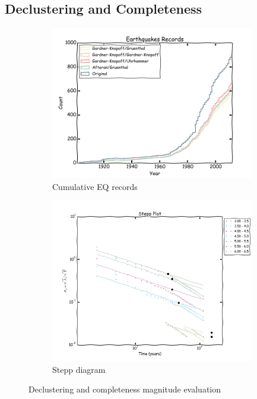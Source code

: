\documentclass[final]{beamer}
\begin{document}
\begin{poster}
\section{Declustering and Completeness}


\begin{figure}[H]
	\centering
	\begin{subfigure}[T]{0.49\textwidth}
	  	\centering
		\includegraphics[width=0.98\textwidth]{decluster_br}
		\caption{Cumulative EQ records}
		\label{fig:br_eq_record}
	\end{subfigure}
	\begin{subfigure}[T]{0.49\textwidth}
	  	\centering
		\includegraphics[width=0.98\textwidth]{stepp_br}
		\caption{Stepp diagram}
		\label{fig:br_stepp}
    \end{subfigure}%
	\caption{Declustering and completeness magnitude evaluation}
	\label{fig:eq_record}
\end{figure}




\end{poster}
\end{document}
